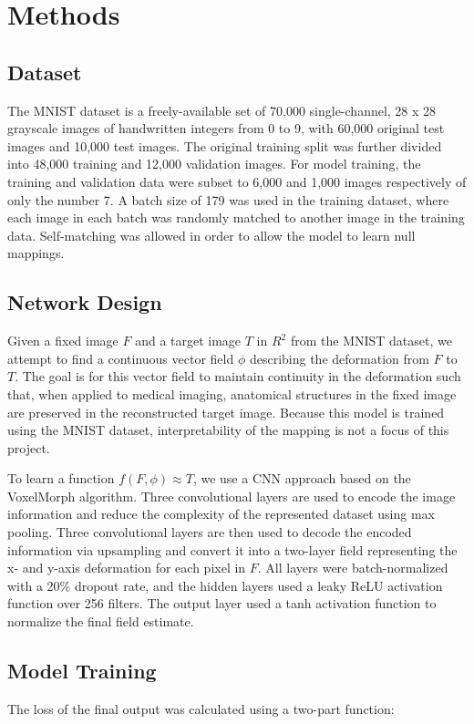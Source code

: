 \documentclass{article} %
\begin{document}
\section{Methods}

\subsection{Dataset}
The MNIST dataset is a freely-available set of 70,000 single-channel, 28 x 28 grayscale images of handwritten integers from 0 to 9, with 60,000 original test images and 10,000 test images. The original training split was further divided into 48,000 training and 12,000 validation images. For model training, the training and validation data were subset to 6,000 and 1,000 images respectively of only the number 7.  A batch size of 179 was used in the training dataset, where each image in each batch was randomly matched to another image in the training data. Self-matching was allowed in order to allow the model to learn null mappings. 

\subsection{Network Design}
Given a fixed image $F$ and a target image $T$ in $R^2$ from the MNIST dataset, we attempt to find a continuous vector field $\phi$ describing the deformation from $F$ to $T$. The goal is for this vector field to maintain continuity in the deformation such that, when applied to medical imaging, anatomical structures in the fixed image are preserved in the reconstructed target image. Because this model is trained using the MNIST dataset, interpretability of the mapping is not a focus of this project. 

To learn a function $f(F, \phi) \approx T$, we use a CNN approach based on the VoxelMorph algorithm. Three convolutional layers are used to encode the image information and reduce the complexity of the represented dataset using max pooling. Three convolutional layers are then used to decode the encoded information via upsampling and convert it into a two-layer field representing the x- and y-axis deformation for each pixel in $F$. All layers were batch-normalized with a 20\% dropout rate, and the hidden layers used a leaky ReLU activation function over 256 filters. The output layer used a tanh activation function to normalize the final field estimate. 

\subsection{Model Training}
The loss of the final output was calculated using a two-part function:
\end{document}
